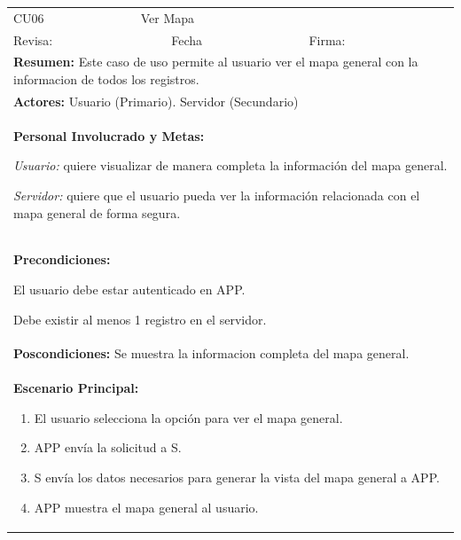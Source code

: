 \begin{longtable}{|l|p{5.5cm}|l|p{2cm}|l|p{1.9cm}|} \hline
    \cellcolor{grisOscuro} CU06 & \multicolumn{4}{|l|}{  \cellcolor{grisOscuro} Ver Mapa} &  \cellcolor{grisClaro}\multirow{2}{1cm}{} \\ \cline{1-5}
    \cellcolor{grisOscuro} Revisa: &  \cellcolor{grisClaro} &  \cellcolor{grisOscuro} Fecha &  \cellcolor{grisClaro} &  \cellcolor{grisOscuro} Firma: & \cellcolor{grisClaro} \\ \hline
    \multicolumn{6}{|p{15cm}|}{ \textbf{Resumen: } Este caso de uso permite al usuario ver el mapa general con la informacion de todos los registros.

    } \\ \hline

    \multicolumn{6}{|p{15cm}|}{ \textbf{Actores: } Usuario (Primario). Servidor (Secundario)

    } \\ \hline

    \multicolumn{6}{|p{15cm}|}{ \textbf{Personal Involucrado y Metas: }
    
    \emph{Usuario:} quiere visualizar de manera completa la información del mapa general.

    \emph{Servidor:} quiere que el usuario pueda ver la información relacionada con el mapa general de forma segura.

    } \\ \hline

    \multicolumn{6}{|p{15cm}|}{ \textbf{Precondiciones: } 
    
    El usuario debe estar autenticado en APP.
    
    Debe existir al menos 1 registro en el servidor.

    } \\ \hline

    \multicolumn{6}{|p{15cm}|}{ \textbf{Poscondiciones: } Se muestra la informacion completa del mapa general.

    } \\ \hline

    \multicolumn{6}{|p{15cm}|}{ \textbf{Escenario Principal: }

    \begin{enumerate}
        \item El usuario selecciona la opción para ver el mapa general.
        \item APP envía la solicitud a S.
        \item S envía los datos necesarios para generar la vista del mapa general a APP.
        \item APP muestra el mapa general al usuario.
    \end{enumerate}

}
\end{longtable}
